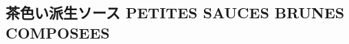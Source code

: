 \documentclass[twoside,12Q,b5paper]{escoffierltjsbook}
\date{}
\begin{document}




\begin{center}
\subsection*{茶色い派生ソース PETITES SAUCES BRUNES
COMPOSEES}\label{ux8336ux8272ux3044ux6d3eux751fux30bdux30fcux30b9-petites-sauces-brunes-composees}
\end{center}
\end{document}
